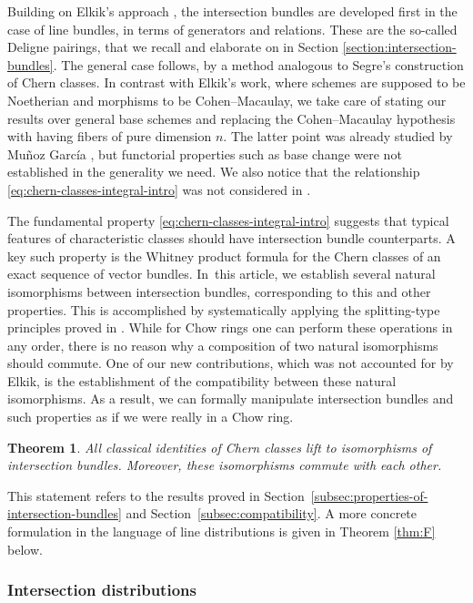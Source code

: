 \documentclass[11pt]{article}
\theoremstyle{plain}
\newtheorem{thm}{Theorem}
\theoremstyle{definition}
\begin{document}
Building on Elkik's approach \cite{Elkikfib}, the intersection bundles are developed first in the case of line bundles, in terms of generators and relations. These are the so-called Deligne pairings, that we recall and elaborate on in Section \ref{section:intersection-bundles}. The general case follows, by a method analogous to Segre's construction of Chern classes. In contrast with Elkik's work, where schemes are supposed to be Noetherian and morphisms to be Cohen--Macaulay, we take care of stating our results over general base schemes and replacing the Cohen--Macaulay hypothesis with having fibers of pure dimension $n$. The latter point was already studied by Muñoz García \cite{Munoz}, but functorial properties such as base change were not established in the generality we need. We also notice that the relationship \eqref{eq:chern-classes-integral-intro} was not considered in \cite{Elkikfib, Munoz}.

The fundamental property \eqref{eq:chern-classes-integral-intro} suggests that typical features of characteristic classes should have intersection bundle counterparts. A key such property is the Whitney product formula for the Chern classes of an exact sequence of vector bundles. In~this article, we establish several natural isomorphisms between intersection bundles, corresponding to this and other properties. This is accomplished by systematically applying the splitting-type principles proved in \cite{Eriksson-Freixas-Wentworth}. While for Chow rings one can perform these operations in any order, there is no reason why a composition of two natural isomorphisms should commute. One of our new contributions, which was not accounted for by Elkik, is the establishment of the compatibility between these natural isomorphisms. As a result, we can formally manipulate intersection bundles and such properties as if we were really in a Chow ring.

\begin{thm}\label{thm:D}
All classical identities of Chern classes lift to isomorphisms of intersection bundles. Moreover, these isomorphisms commute with each other.
\end{thm}
This statement refers to the results proved in Section~\ref{subsec:properties-of-intersection-bundles} and Section~\ref{subsec:compatibility}. A more concrete formulation in the language of line distributions is given in Theorem \ref{thm:F} below.

\subsubsection*{Intersection distributions}
\end{document}
